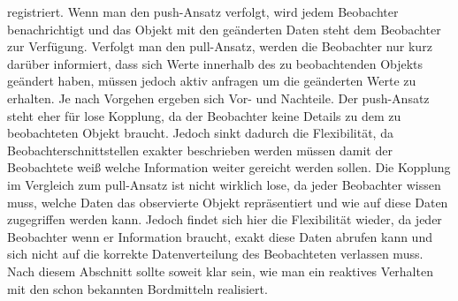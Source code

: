 registriert. Wenn man den push-Ansatz verfolgt, wird jedem Beobachter benachrichtigt und das Objekt mit den geänderten Daten steht dem Beobachter zur Verfügung. Verfolgt man den pull-Ansatz, werden die Beobachter nur kurz darüber informiert, dass sich Werte innerhalb des zu beobachtenden Objekts geändert haben, müssen jedoch aktiv anfragen um die geänderten Werte zu erhalten. Je nach Vorgehen ergeben sich Vor- und Nachteile. Der push-Ansatz steht eher für lose Kopplung, da der Beobachter keine Details zu dem zu beobachteten Objekt braucht. Jedoch sinkt dadurch die Flexibilität, da Beobachterschnittstellen exakter beschrieben werden müssen damit der Beobachtete weiß welche Information weiter gereicht werden sollen. Die Kopplung im Vergleich zum pull-Ansatz ist nicht wirklich lose, da jeder Beobachter wissen muss, welche Daten das observierte Objekt repräsentiert und wie auf diese Daten zugegriffen werden kann. Jedoch findet sich hier die Flexibilität wieder, da jeder Beobachter wenn er Information braucht, exakt diese Daten abrufen kann und sich nicht auf die korrekte Datenverteilung des Beobachteten verlassen muss. \\ Nach diesem Abschnitt sollte soweit klar sein, wie man ein reaktives Verhalten mit den schon bekannten Bordmitteln realisiert.
